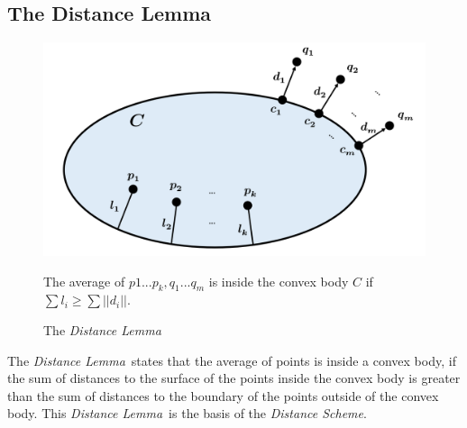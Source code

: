 \documentclass[10pt, conference]{IEEEtran}
\newcommand{\distanceScheme}{\textit{Distance Scheme}}
\newcommand{\distanceLemma}{\textit{Distance Lemma}}
\begin{document}
\subsection{The Distance Lemma}
\begin{figure}[b]
\begin{center}
\includegraphics[width=0.9\linewidth]{Pics/PNGs/DistanceLemma.png}
\end{center}
{\centering
\caption{The \distanceLemma}}
\medskip
\small
The average of ${p1...p_k, q_1...q_m}$ is inside the convex body $C$ if ${\sum l_i \geq \sum ||d_i||}$.
\end{figure}
The \distanceLemma \ states that the average of points is inside a convex body, if the sum of distances to the surface of the points inside the convex body is greater than the sum of distances to the boundary of the points outside of the convex body. This \distanceLemma \ is the basis of the \distanceScheme . \\
\end{document}
